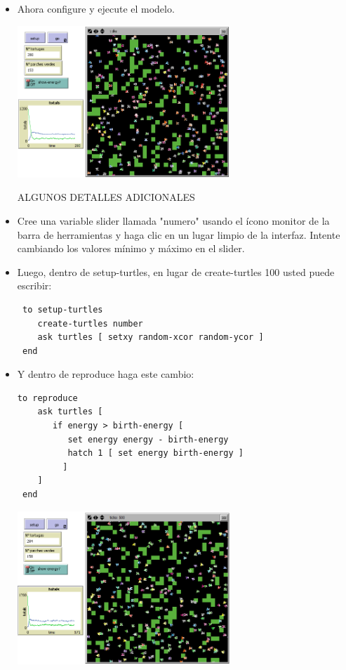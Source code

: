 \documentclass[12pt,letterpaper]{article}
\begin{document}
\begin{itemize}
\item Ahora configure y ejecute el modelo.

\begin{center}
	\includegraphics[width=8cm]{./imagenes/image14.png}
\end{center}

\begin{center}
ALGUNOS DETALLES ADICIONALES
\end{center}

\item Cree una variable slider llamada "numero" usando el ícono monitor de la barra de herramientas y haga clic en un lugar limpio de la interfaz. Intente cambiando los valores mínimo y máximo en el slider.
\item Luego, dentro de setup-turtles, en lugar de create-turtles 100 usted puede escribir:

\begin{lstlisting}
 to setup-turtles
    create-turtles number
    ask turtles [ setxy random-xcor random-ycor ]
 end
\end{lstlisting}
\item Y dentro de reproduce haga este cambio:
\begin{lstlisting}
to reproduce
    ask turtles [
       if energy > birth-energy [
          set energy energy - birth-energy
          hatch 1 [ set energy birth-energy ]
         ] 
    ] 
 end
\end{lstlisting}


\begin{center}
	\includegraphics[width=8cm]{./imagenes/image15.png}
\end{center}



\end{itemize}
\end{document}

